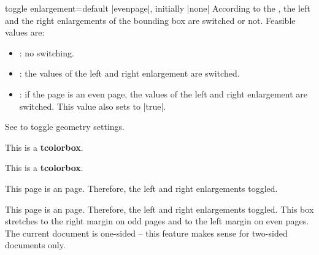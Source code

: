 \begin{docTcbKey}[][doc updated=2015-11-13]{toggle enlargement}{=}{default |evenpage|, initially |none|}
  According to the , the left and the right enlargements of
  the bounding box are switched or not. Feasible values are:
  \begin{itemize}
  \item{}: no switching.
  \item{}: the values of the left and right enlargement are switched.
  \item{}: if the page is an even page, the values of the left and
    right enlargement are switched. This value also sets
     to |true|.
  \end{itemize}
\begin{marker}
See  to toggle geometry settings.
\end{marker}

\begin{dispExample}

\begin{tcolorbox}[toggle enlargement=none,enhanced,show bounding box]
This is a \textbf{tcolorbox}.
\end{tcolorbox}
\begin{tcolorbox}[toggle enlargement=forced]
This is a \textbf{tcolorbox}.
\end{tcolorbox}
\begin{tcolorbox}[toggle enlargement=evenpage]
  This page is an  page.
  Therefore, the left and right enlargements
   toggled.
\end{tcolorbox}
\end{dispExample}

\begin{dispListing}
\begin{tcolorbox}[colframe=red!60!black,colback=red!15!white,
  fonttitle=\bfseries,title=Floating box from \texttt{toggle enlargement},
  width=\textwidth,grow to right by=2cm,toggle enlargement,float=t]
  This page is an  page.
  Therefore, the left and right enlargements  toggled.
  This box stretches to the right margin on odd pages and to the left
  margin on even pages. The current document is one-sided -- this feature makes
  sense for two-sided documents only.
\end{tcolorbox}
\end{dispListing}
\tcbusetemp
\end{docTcbKey}




